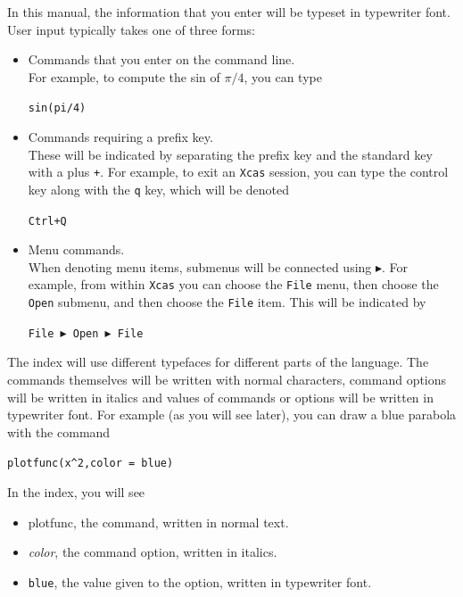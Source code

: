 \documentclass[a4paper,11pt]{book}
\begin{document}
In this manual, the information that you enter will be typeset in
typewriter font.  User input typically takes one of three forms:
\begin{itemize}
\item Commands that you enter on the command line.\\
For example, to compute the sin of $\pi/4$, you can type
\begin{center}
{\tt sin(pi/4)}
\end{center}

\item Commands requiring a prefix key.\\
These will be indicated by separating
the prefix key and the standard key with a plus \texttt{+}.  For
example, to exit an \texttt{Xcas} session, you can type the control
key along with the \texttt{q} key, which will be denoted
\begin{center}
{\tt  Ctrl+Q}
\end{center}

\item Menu commands.\\
When denoting menu items, submenus will be connected using
$\blacktriangleright$.  For example, from within \texttt{Xcas} you
can choose the \texttt{File} menu, then choose the \texttt{Open}
submenu, and then choose the \texttt{File} item.  This will be
indicated by
\begin{center}
  {\tt File $\blacktriangleright$ Open $\blacktriangleright$ File}
\end{center}
\end{itemize}

The index will use different typefaces for different parts of
the language.  The commands themselves will be written with normal
characters, command options will be written in italics and values of
commands or options will be written in typewriter font.   For example
(as you will see later), you can draw a blue parabola with the command
\begin{center}
  {\tt plotfunc(x\^{}2,color = blue)}
\end{center}
In the index, you will see
\begin{itemize}
\item
  plotfunc, the command, written in normal text.
\item
  \textit{color}, the command option, written in italics.
\item
  \texttt{blue}, the value given to the option, written in typewriter
  font.
\end{itemize}
\end{document}
